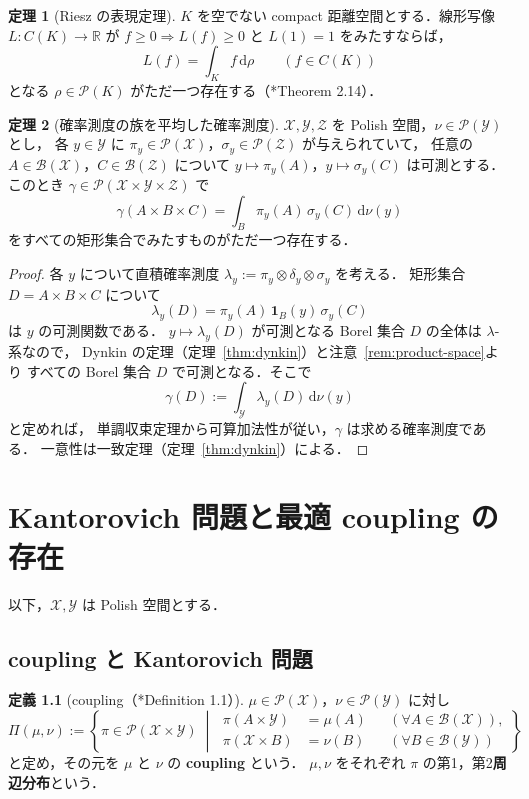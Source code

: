 \documentclass[12pt,a4j,twoside]{jreport}
\numberwithin{equation}{chapter}
\theoremstyle{definition} %
\newtheorem{thm}{定理}[chapter]
\newtheorem{dfn}[thm]{定義}
\newcommand{\R}{{\mathbb R}} %
\newcommand{\X}{\mathcal{X}}
\newcommand{\Y}{\mathcal{Y}}
\newcommand{\Borel}{\mathcal{B}}
\newcommand{\Prob}{\mathcal{P}}
\newcommand{\Couplings}{\Pi}
\renewcommand{\d}{\mathrm{d}} %
\begin{document}
\begin{thm}[Riesz の表現定理]\label{thm:riesz}
  $K$ を空でない compact 距離空間とする．線形写像 $L\colon C(K)\to\R$ が
  $f\geq0\Rightarrow L(f)\geq0$ と $L(1)=1$ をみたすならば，
  \[
    L(f)=\int_Kf\,\d\rho\qquad(f\in C(K))
  \]
  となる $\rho\in\Prob(K)$ がただ一つ存在する（\cite{Rudin}*{Theorem 2.14}）．
\end{thm}

\begin{thm}[確率測度の族を平均した確率測度]\label{thm:kernel}
  $\X,\Y,\mathcal{Z}$ を Polish 空間，$\nu\in\Prob(\Y)$ とし，
  各 $y\in\Y$ に $\pi_y\in\Prob(\X)$，$\sigma_y\in\Prob(\mathcal{Z})$ が与えられていて，
  任意の $A\in\Borel(\X)$，$C\in\Borel(\mathcal{Z})$ について
  $y\mapsto\pi_y(A)$，$y\mapsto\sigma_y(C)$ は可測とする．
  このとき $\gamma\in\Prob(\X\times\Y\times\mathcal{Z})$ で
  \[
    \gamma(A\times B\times C)=\int_B\pi_y(A)\,\sigma_y(C)\,\d\nu(y)
  \]
  をすべての矩形集合でみたすものがただ一つ存在する．
\end{thm}

\begin{proof}
  各 $y$ について直積確率測度 $\lambda_y:=\pi_y\otimes\delta_y\otimes\sigma_y$ を考える．
  矩形集合 $D=A\times B\times C$ について
  \[
    \lambda_y(D)=\pi_y(A)\,\mathbf{1}_B(y)\,\sigma_y(C)
  \]
  は $y$ の可測関数である．
  $y\mapsto\lambda_y(D)$ が可測となる Borel 集合 $D$ の全体は $\lambda$-系なので，
  Dynkin の定理（定理~\ref{thm:dynkin}）と注意~\ref{rem:product-space}より
  すべての Borel 集合 $D$ で可測となる．そこで
  \[
    \gamma(D):=\int_\Y\lambda_y(D)\,\d\nu(y)
  \]
  と定めれば，
  単調収束定理から可算加法性が従い，$\gamma$ は求める確率測度である．
  一意性は一致定理（定理~\ref{thm:dynkin}）による．
\end{proof}


\chapter{Kantorovich 問題と最適 coupling の存在}
\label{ch:kantorovich}

以下，$\X,\Y$ は Polish 空間とする．

\section{coupling と Kantorovich 問題}

\begin{dfn}[coupling（\cite{Villani}*{Definition 1.1}）]\label{dfn:coupling}
  $\mu\in\Prob(\X)$，$\nu\in\Prob(\Y)$ に対し
  \[
    \Couplings(\mu,\nu)
    :=
    \left\{
      \pi\in\Prob(\X\times\Y)
      \;\middle|\;
      \begin{aligned}
        \pi(A\times\Y)&=\mu(A) &&(\forall A\in\Borel(\X)),\\
        \pi(\X\times B)&=\nu(B) &&(\forall B\in\Borel(\Y))
      \end{aligned}
    \right\}
  \]
  と定め，その元を $\mu$ と $\nu$ の \textbf{coupling} という．
  $\mu,\nu$ をそれぞれ $\pi$ の第1，第2\textbf{周辺分布}という．
\end{dfn}
\end{document}
